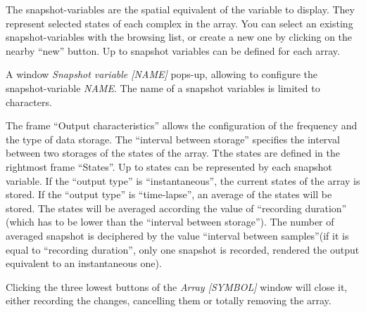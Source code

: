 The snapshot-variables are the spatial equivalent of the variable to display.
They represent selected states of each complex in the array. You can select an
existing snapshot-variables with the browsing list, or create a new one by
clicking on the nearby ``new'' button. Up to \MAXNUMARRAYSNAPSVARIABLES{}
snapshot variables can be defined for each array.

 A window \emph{Snapshot
  variable [NAME]} pops-up, allowing to configure the snapshot-variable
\emph{NAME}. The name of a snapshot variables is limited to
\MAXARRAYVARNAMELENGTH{} characters.

The frame ``Output characteristics'' allows the configuration of the frequency
and the type of data storage. The ``interval between storage'' specifies the
interval between two storages of the states of the array. Tthe states are
defined in the rightmost frame ``States''. Up to \MAXNUMARRAYSNAPSSTATES{}
states can be represented by each snapshot variable.  If the ``output type'' is
``instantaneous'', the current states of the array is stored. If the ``output
type'' is ``time-lapse'', an average of the states will be stored. The states
will be averaged according the value of ``recording duration'' (which has to be
lower than the ``interval between storage''). The number of averaged snapshot is
deciphered by the value ``interval between samples''(if it is equal to
``recording duration'', only one snapshot is recorded, rendered the output
equivalent to an instantaneous one).

Clicking the three lowest buttons of the \emph{Array [SYMBOL]} window will close it,
either recording the changes, cancelling them or totally removing the array.

